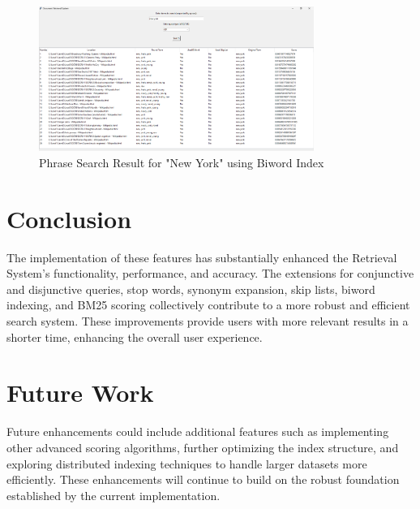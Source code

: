 \documentclass[a4paper,10pt]{article}
\begin{document}
\begin{figure}[H]
    \centering
    \includegraphics[width=0.8\textwidth]{new_york.png}
    \caption{Phrase Search Result for "New York" using Biword Index}
    \label{fig:biword-search}
\end{figure}


\section{Conclusion}

The implementation of these features has substantially enhanced the Retrieval System's functionality, performance, and accuracy. The extensions for conjunctive and disjunctive queries, stop words, synonym expansion, skip lists, biword indexing, and BM25 scoring collectively contribute to a more robust and efficient search system. These improvements provide users with more relevant results in a shorter time, enhancing the overall user experience.

\section{Future Work}

Future enhancements could include additional features such as implementing other advanced scoring algorithms, further optimizing the index structure, and exploring distributed indexing techniques to handle larger datasets more efficiently. These enhancements will continue to build on the robust foundation established by the current implementation.
\end{document}
